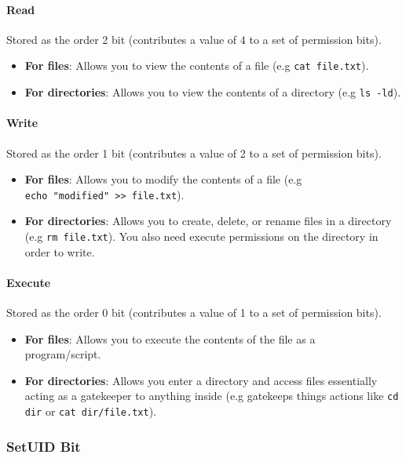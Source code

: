 \documentclass{article}
\newcommand{\code}[1]{\texttt{#1}}
\begin{document}
\paragraph{Read} Stored as the order 2 bit (contributes a value of 4 to a set of permission bits).

\begin{itemize}
    \item \textbf{For files}: Allows you to view the contents of a file (e.g \code{cat file.txt}).
    \item \textbf{For directories}: Allows you to view the contents of a directory (e.g \code{ls -ld}).
\end{itemize}

\paragraph{Write} Stored as the order 1 bit (contributes a value of 2 to a set of permission bits).

\begin{itemize}
    \item \textbf{For files}: Allows you to modify the contents of a file (e.g \\\code{echo "modified" >> file.txt}).
    \item \textbf{For directories}: Allows you to create, delete, or rename files in a directory (e.g \code{rm file.txt}). You also need execute permissions on the directory in order to write.
\end{itemize}

\paragraph{Execute} Stored as the order 0 bit (contributes a value of 1 to a set of permission bits).

\begin{itemize}
    \item \textbf{For files}: Allows you to execute the contents of the file as a \\program/script.
    \item \textbf{For directories}: Allows you enter a directory and access files essentially acting as a gatekeeper to anything inside (e.g gatekeeps things actions like \code{cd dir} or \code{cat dir/file.txt}).
\end{itemize}

\subsubsection{SetUID Bit}
\end{document}
